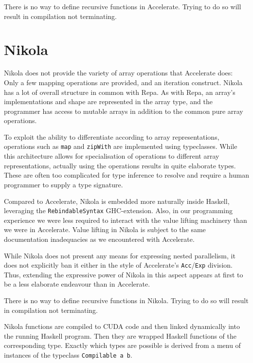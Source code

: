 There is no way to define recursive functions in Accelerate. Trying to do so
will result in compilation not terminating.

\section{Nikola}
\label{sec:language-discussion-nikola}

Nikola does not provide the variety of array operations that Accelerate does: Only
a few mapping operations are provided, and an iteration construct.  Nikola has
a lot of overall structure in common with Repa. As with Repa, an array's
implementations and shape are represented in the array type, and the programmer
has access to mutable arrays in addition to the common pure array operations.

To exploit the ability to differentiate according to array representations,
operations such as \lstinline{map} and \lstinline{zipWith} are implemented using
typeclasses.  While this architecture allows for specialisation of operations
to different array representations, actually using the operations results in quite
elaborate types. These are often too complicated for type inference to resolve
and require a human programmer to supply a type signature.

Compared to Accelerate, Nikola is embedded more naturally inside Haskell,
leveraging the \lstinline{RebindableSyntax} GHC-extension. Also, in our programming
experience we were less required to interact with the value lifting machinery
than we were in Accelerate. Value lifting in Nikola is subject to the same
documentation inadequacies as we encountered with Accelerate.

While Nikola does not present any means for expressing nested parallelism, it
does not explicitly ban it either in the style of Accelerate's
\lstinline{Acc}/\lstinline{Exp} division. Thus, extending the expressive power of
Nikola in this aspect appears at first to be a less elaborate endeavour than in
Accelerate.

There is no way to define recursive functions in Nikola. Trying to do so
will result in compilation not terminating.

Nikola functions are compiled to CUDA code and then linked dynamically into
the running Haskell program. Then they are wrapped Haskell functions of
the corresponding type.  Exactly which types are possible is derived
from a menu of instances of the typeclass \lstinline{Compilable a b}.


